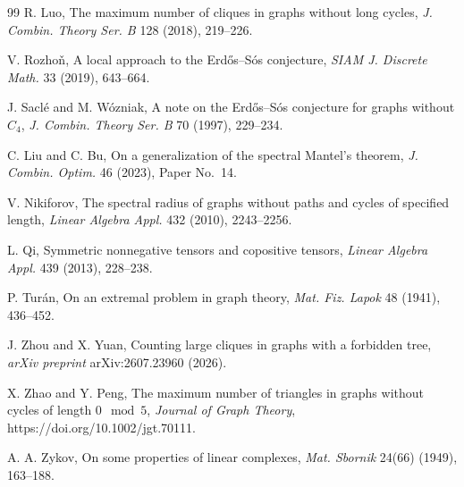 \documentclass[11pt,a4paper]{article}
\begin{document}
\begin{thebibliography}{99}
R. Luo,
The maximum number of cliques in graphs without long cycles,
\emph{J. Combin. Theory Ser. B} 128 (2018), 219--226.

V. Rozho\v{n},
A local approach to the Erd\H{o}s--S\'{o}s conjecture,
\emph{SIAM J. Discrete Math.} 33 (2019), 643--664.

J. Sacl\'{e} and M. W\'{o}zniak,
A note on the Erd\H{o}s--S\'{o}s conjecture for graphs without \(C_4\),
\emph{J. Combin. Theory Ser. B} 70 (1997), 229--234.

C. Liu and C. Bu,
On a generalization of the spectral Mantel's theorem,
\emph{J. Combin. Optim.} 46 (2023), Paper No.~14.

V. Nikiforov,
The spectral radius of graphs without paths and cycles of specified length,
\emph{Linear Algebra Appl.} 432 (2010), 2243--2256.

L. Qi,
Symmetric nonnegative tensors and copositive tensors,
\emph{Linear Algebra Appl.} 439 (2013), 228--238.

P. Tur\'{a}n,
On an extremal problem in graph theory,
\emph{Mat. Fiz. Lapok} 48 (1941), 436--452.

J. Zhou and X. Yuan,
Counting large cliques in graphs with a forbidden tree,
\emph{arXiv preprint} arXiv:2607.23960 (2026).

 X. Zhao and Y. Peng, The maximum number of triangles in graphs without cycles of length $0\mod5$, \emph{Journal of Graph Theory}, https://doi.org/10.1002/jgt.70111.

A. A. Zykov,
On some properties of linear complexes,
\emph{Mat. Sbornik} 24(66) (1949), 163--188.

\end{thebibliography}
\end{document}
